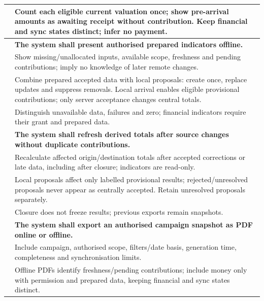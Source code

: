 {\begin{longtable}{L{0.18}L{0.82}}
\label{ac:059:b} & Count each eligible current valuation once; show pre-arrival amounts as awaiting receipt without contribution. Keep financial and sync states distinct; infer no payment.\\
\midrule
{}
\label{fr:060}\textbf{} & \textbf{The system shall present authorised prepared indicators offline.}\\*
\label{ac:060:a} & Show missing/unallocated inputs, available scope, freshness and pending contributions; imply no knowledge of later remote changes.\\
\label{ac:060:b} & Combine prepared accepted data with local proposals: create once, replace updates and suppress removals. Local arrival enables eligible provisional contributions; only server acceptance changes central totals.\\
\label{ac:060:c} & Distinguish unavailable data, failures and zero; financial indicators require their grant and prepared data.\\
\midrule
{}
\label{fr:061}\textbf{} & \textbf{The system shall refresh derived totals after source changes without duplicate contributions.}\\*
\label{ac:061:a} & Recalculate affected origin/destination totals after accepted corrections or late data, including after closure; indicators are read-only.\\
\label{ac:061:b} & Local proposals affect only labelled provisional results; rejected/unresolved proposals never appear as centrally accepted. Retain unresolved proposals separately.\\
\label{ac:061:c} & Closure does not freeze results; previous exports remain snapshots.\\
\midrule
{}
\label{fr:062}\textbf{} & \textbf{The system shall export an authorised campaign snapshot as PDF online or offline.}\\*
\label{ac:062:a} & Include campaign, authorised scope, filters/date basis, generation time, completeness and synchronisation limits.\\
\label{ac:062:b} & Offline PDFs identify freshness/pending contributions; include money only with permission and prepared data, keeping financial and sync states distinct.\\

\end{longtable}}
